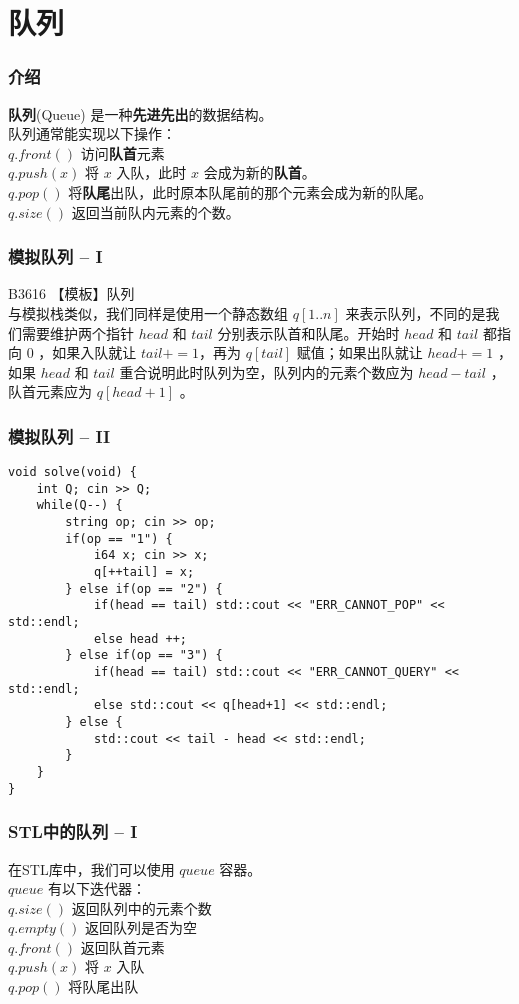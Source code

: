 \documentclass{beamer}
\newcommand{\fdf}[1]{\alert{\textbf{#1}}}
\begin{document}
\section{队列}
\begin{frame}
\frametitle{介绍}
\fdf{队列}(Queue) 是一种\fdf{先进先出}的数据结构。\\
队列通常能实现以下操作：\\
$q.front()$ 访问\fdf{队首}元素\\
$q.push(x)$ 将 $x$ 入队，此时 $x$ 会成为新的\fdf{队首}。\\ 
$q.pop()$ 将\fdf{队尾}出队，此时原本队尾前的那个元素会成为新的队尾。\\ 
$q.size()$ 返回当前队内元素的个数。 \\ 
\end{frame}
\begin{frame}
\frametitle{模拟队列 -- I}
B3616 【模板】队列 \\ 
与模拟栈类似，我们同样是使用一个静态数组 $q[1..n]$ 来表示队列，不同的是我们需要维护两个指针 $head$ 和 $tail$ 分别表示队首和队尾。开始时 $head$ 和 $tail$ 都指向 $0$ ，如果入队就让 $tail += 1$，再为 $q[tail]$ 赋值；如果出队就让 $head += 1$ ，如果 $head$ 和 $tail$ 重合说明此时队列为空，队列内的元素个数应为 $head - tail$ ，队首元素应为 $q[head + 1]$ 。
\end{frame}
\begin{frame}[fragile]
\frametitle{模拟队列 -- II}
\begin{onlyenv}
\begin{verbatim}
void solve(void) {
    int Q; cin >> Q;
    while(Q--) {
        string op; cin >> op;
        if(op == "1") {
            i64 x; cin >> x;
            q[++tail] = x;
        } else if(op == "2") {
            if(head == tail) std::cout << "ERR_CANNOT_POP" << std::endl;
            else head ++;
        } else if(op == "3") {
            if(head == tail) std::cout << "ERR_CANNOT_QUERY" << std::endl;
            else std::cout << q[head+1] << std::endl;
        } else {
            std::cout << tail - head << std::endl;
        }
    }
}
\end{verbatim}
\end{onlyenv}
\end{frame}
\begin{frame}
\frametitle{STL中的队列 -- I}
在STL库中，我们可以使用 $queue$ 容器。\\
$queue$ 有以下迭代器： \\ 
$q.size()$ 返回队列中的元素个数 \\
$q.empty()$ 返回队列是否为空 \\
$q.front()$ 返回队首元素 \\
$q.push(x)$ 将 $x$ 入队 \\
$q.pop()$ 将队尾出队
\end{frame}
\end{document}
